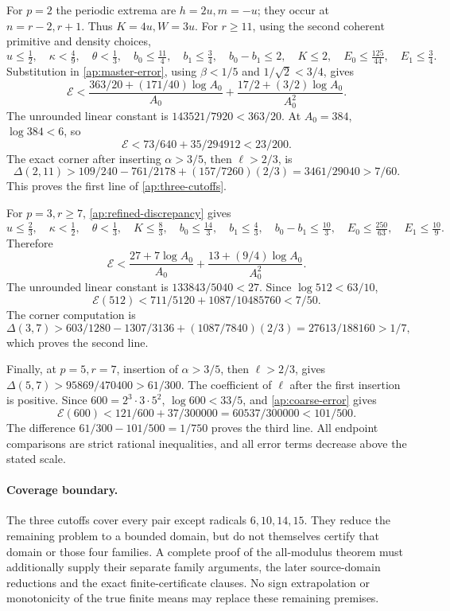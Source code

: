 \documentclass[11pt]{article}
\theoremstyle{definition}\newtheorem{definition}[theorem]{Definition}
\theoremstyle{remark}\newtheorem{remark}[theorem]{Remark}
\begin{document}
For \(p=2\) the periodic extrema are \(h=2u,m=-u\);
they occur at \(n=r-2,r+1\). Thus \(K=4u,W=3u\).
For \(r\geq11\), using the second coherent primitive and density choices,
\[
 u\leq\tfrac12,\quad\kappa<\tfrac49,\quad\theta<\tfrac13,\quad
 b_0\leq\tfrac{11}4,\quad b_1\leq\tfrac34,\quad b_0-b_1\leq2,\quad K\leq2,
 \quad E_0\leq\tfrac{125}{44},\quad E_1\leq\tfrac34 .
\]
Substitution in \eqref{ap:master-error}, using
\(\beta<1/5\) and \(1/\sqrt2<3/4\), gives
\[
 \mathcal E<
 \frac{363/20+(171/40)\log A_0}{A_0}
 +\frac{17/2+(3/2)\log A_0}{A_0^2}.
\]
The unrounded linear constant is \(143521/7920<363/20\).
At \(A_0=384\), \(\log384<6\), so
\[
 \mathcal E<73/640+35/294912<23/200.
\]
The exact corner after inserting \(\alpha>3/5\), then \(\ell>2/3\), is
\[
 \Delta(2,11)>
 109/240-761/2178+(157/7260)(2/3)
 =3461/29040>7/60.
\]
This proves the first line of \eqref{ap:three-cutoffs}.

For \(p=3,r\geq7\), \eqref{ap:refined-discrepancy} gives
\[
 u\leq\tfrac23,\quad\kappa<\tfrac12,\quad\theta<\tfrac13,\quad
 K\leq\tfrac83,\quad b_0\leq\tfrac{14}3,\quad b_1\leq\tfrac43,\quad
 b_0-b_1\leq\tfrac{10}3,\quad E_0\leq\tfrac{250}{63},\quad E_1\leq\tfrac{10}9 .
\]
Therefore
\[
 \mathcal E<
 \frac{27+7\log A_0}{A_0}
 +\frac{13+(9/4)\log A_0}{A_0^2}.
\]
The unrounded linear constant is \(133843/5040<27\).
Since \(\log512<63/10\),
\[
 \mathcal E(512)<711/5120+1087/10485760<7/50.
\]
The corner computation is
\[
 \Delta(3,7)>
 603/1280-1307/3136+(1087/7840)(2/3)
 =27613/188160>1/7,
\]
which proves the second line.

Finally, at \(p=5,r=7\), insertion of \(\alpha>3/5\), then
\(\ell>2/3\), gives
\(\Delta(5,7)>95869/470400>61/300\).
The coefficient of \(\ell\) after the first insertion is positive.
Since \(600=2^3\cdot3\cdot5^2\), \(\log600<33/5\), and
\eqref{ap:coarse-error} gives
\[
 \mathcal E(600)<121/600+37/300000
                =60537/300000<101/500.
\]
The difference \(61/300-101/500=1/750\) proves the third line.
All endpoint comparisons are strict rational inequalities, and all error
terms decrease above the stated scale.

\paragraph{Coverage boundary.}
The three cutoffs cover every pair except radicals \(6,10,14,15\).
They reduce the remaining problem to a bounded domain, but do not themselves
certify that domain or those four families.
A complete proof of the all-modulus theorem must additionally supply their
separate family arguments, the later source-domain reductions and the exact
finite-certificate clauses. No sign extrapolation or monotonicity of the
true finite means may replace these remaining premises.
\end{document}
